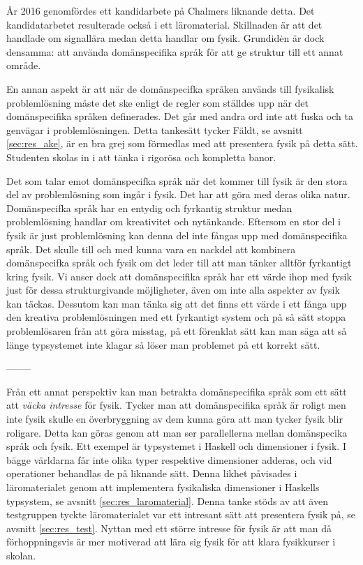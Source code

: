 \begin{binge}
År 2016 genomfördes ett kandidarbete på Chalmers liknande detta. \cite{DSL2016}
Det kandidatarbetet resulterade också i ett läromaterial. Skillnaden är att det
handlade om signallära medan detta handlar om fysik. Grundidėn är dock densamma:
att använda domänspecifika språk för att ge struktur till ett annat område.

En annan aspekt är att när de domänspecifka språken används till fysikalisk
problemlösning måste det ske enligt de regler som ställdes upp när det
domänspecifika språken definerades. Det går med andra ord inte att fuska och ta
genvägar i problemlösningen. Detta tankesätt tycker Fäldt, se avsnitt
\ref{sec:res_ake}, är en bra grej som förmedlas med att presentera fysik på
detta sätt. Studenten skolas in i att tänka i rigorösa och kompletta banor.

Det som talar emot domänspecifka språk när det kommer till fysik är den stora
del av problemlösning som ingår i fysik. Det har att göra med deras olika natur.
Domänspecifka språk har en entydig och fyrkantig struktur medan problemlösning
handlar om kreativitet och nytänkande. Eftersom en stor del i fysik är just
problemlösning kan denna del inte fångas upp med domänspecifika språk. Det
skulle till och med kunna vara en nackdel att kombinera domänspecifka språk och
fysik om det leder till att man tänker alltför fyrkantigt kring fysik. Vi anser
dock att domänspecifika språk har ett värde ihop med fysik just för dessa
strukturgivande möjligheter, även om inte alla aspekter av fysik kan täckas.
Dessutom kan man tänka sig att det finns ett värde i ett fånga upp den kreativa
problemlösningen med ett fyrkantigt system och på så sätt stoppa problemlösaren
från att göra misstag, på ett förenklat sätt kan man säga att så länge
typsystemet inte klagar så löser man problemet på ett korrekt sätt.

--------

Från ett annat perspektiv kan man betrakta domänspecifika språk som ett sätt att
\textit{väcka intresse} för fysik. Tycker man att domänspecifika språk är roligt
men inte fysik skulle en överbryggning av dem kunna göra att man tycker fysik
blir roligare. Detta kan göras genom att man ser parallellerna mellan
domänspecika språk och fysik. Ett exempel är typsystemet i Haskell och
dimensioner i fysik. I bägge världarna får inte olika typer respektive
dimensioner adderas, och vid operationer behandlas de på liknande sätt. Denna
likhet påvisades i läromaterialet genom att implementera fysikaliska dimensioner
i Haskells typsystem, se avsnitt \ref{sec:res_laromaterial}. Denna tanke stöds
av att även testgruppen tyckte läromaterialet var ett intresant sätt att
presentera fysik på, se avsnitt \ref{sec:res_test}. Nyttan med ett större
intresse för fysik är att man då förhoppningsvis är mer motiverad att lära sig
fysik för att klara fysikkurser i skolan. 




\end{binge}
